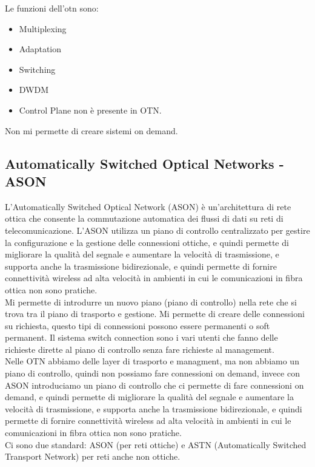 Le funzioni dell'otn sono:
\begin{itemize}
    \item Multiplexing
    \item Adaptation
    \item Switching
    \item DWDM 
    \item Control Plane non è presente in OTN.
\end{itemize}

Non mi permette di creare sistemi on demand.

\subsection{Automatically Switched Optical Networks - ASON}
L'Automatically Switched Optical Network (ASON) è un'architettura di rete ottica che consente la commutazione automatica dei flussi di dati su reti di telecomunicazione. L'ASON utilizza un piano di controllo centralizzato per gestire la configurazione e la gestione delle connessioni ottiche, e quindi permette di migliorare la qualità del segnale e aumentare la velocità di trasmissione, e supporta anche la trasmissione bidirezionale, e quindi permette di fornire connettività wireless ad alta velocità in ambienti in cui le comunicazioni in fibra ottica non sono pratiche.\\

Mi permette di introdurre un nuovo piano (piano di controllo) nella rete che si trova tra il piano di trasporto e gestione. Mi permette di creare delle connessioni su richiesta, questo tipi di connessioni possono essere permanenti o soft permanent. Il sistema switch connection sono i vari utenti che fanno delle richieste dirette al piano di controllo senza fare richieste al management.\\

Nelle OTN abbiamo delle layer di trasporto e managment, ma non abbiamo un piano di controllo, quindi non possiamo fare connessioni on demand, invece con ASON introduciamo un piano di controllo che ci permette di fare connessioni on demand, e quindi permette di migliorare la qualità del segnale e aumentare la velocità di trasmissione, e supporta anche la trasmissione bidirezionale, e quindi permette di fornire connettività wireless ad alta velocità in ambienti in cui le comunicazioni in fibra ottica non sono pratiche.\\

Ci sono due standard: ASON (per reti ottiche) e ASTN (Automatically Switched Transport Network) per reti anche non ottiche.\\

